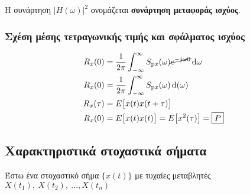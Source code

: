 \documentclass[11pt,a4paper,notitlepage,fleqn,draft]{article}
\begin{document}
Η συνάρτηση \( \big\lvert H(\omega ) \big\rvert^2 \) ονομάζεται
\textbf{συνάρτηση μεταφοράς ισχύος}.

\subsubsection{Σχέση μέσης τετραγωνικής τιμής και σφάλματος ισχύος}
\begin{align*}
	R_x(0) &= \frac{1}{2\pi} \int_{-\infty}^{\infty}
	S_{\mathrm p x}(\omega )
	\cancel{e^{-j\omega 0}}\mathop{}\!\mathrm{d} \omega \\
	R_x(0) &= \frac{1}{2\pi} \int_{-\infty}^{\infty} S_{\mathrm p x}
	(\omega ) \mathop{}\!\mathrm{d} (\omega ) \\
	R_x(\tau) &= E\big[ x(t)x(t+\tau) \big] \\
	R_x(0) &= E\big[ x(t)x(t) \big] = E\big[ x^2(\tau) \big] =
	\boxed{P}
\end{align*}


\subsection{Χαρακτηριστικά στοχαστικά σήματα}
Έστω ένα στοχαστικό σήμα \( \bigg\lbrace x(t) \bigg\rbrace \) με
τυχαίες μεταβλητές \( X(t_1),\ X(t_2),\ \dots, X(t_n) \)
\end{document}
